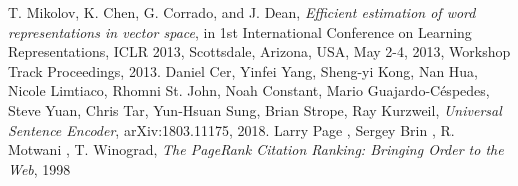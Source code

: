 \documentclass{article}
\begin{document}
\begin{thebibliography}{9}

  T. Mikolov, K. Chen, G. Corrado, and J. Dean,
  \textit{Efficient estimation of word representations in vector space},
  in 1st International Conference on Learning Representations, 
  ICLR 2013, 
  Scottsdale, Arizona, USA, May 2-4, 2013, 
  Workshop Track Proceedings, 2013.
    Daniel Cer, Yinfei Yang, Sheng-yi Kong, Nan Hua, Nicole Limtiaco, Rhomni St. John, Noah Constant, Mario Guajardo-Céspedes, Steve Yuan, Chris Tar, Yun-Hsuan Sung, Brian Strope, Ray Kurzweil, 
    \textit{Universal Sentence Encoder}, 
    arXiv:1803.11175, 2018.
    Larry Page , Sergey Brin , R. Motwani , T. Winograd, 
    \textit{The PageRank Citation Ranking: Bringing Order to the Web}, 1998
\end{thebibliography}
\end{document}

